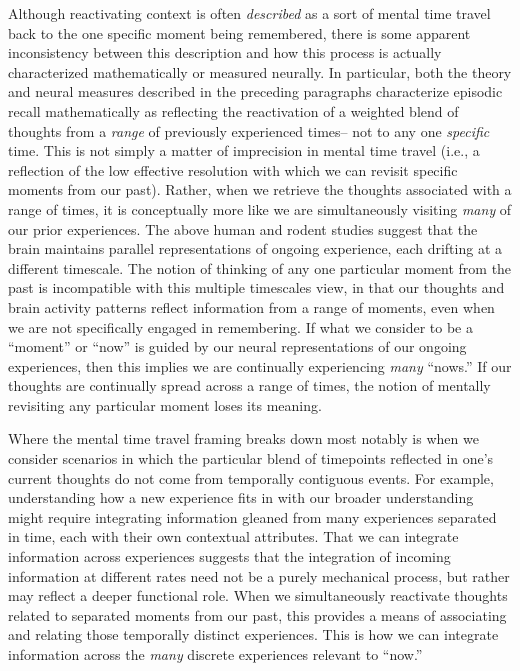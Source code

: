 \documentclass{article}
\begin{document}
Although reactivating context is often \textit{described} as a sort of mental time travel back to the one specific moment being remembered, there is some apparent inconsistency between this description and how this process is actually characterized mathematically or measured neurally.  In particular, both the theory and neural measures described in the preceding paragraphs characterize episodic recall mathematically as reflecting the reactivation of a weighted blend of thoughts from a \textit{range} of previously experienced times-- not to any one \textit{specific} time.  This is not simply a matter of imprecision in mental time travel (i.e., a reflection of the low effective resolution with which we can revisit specific moments from our past).  Rather, when we retrieve the thoughts associated with a range of times, it is conceptually more like we are simultaneously visiting \textit{many} of our prior experiences. The above human and rodent studies suggest that the brain maintains parallel representations of ongoing experience, each drifting at a different timescale.  The notion of thinking of any one particular moment from the past is incompatible with this multiple timescales view, in that our thoughts and brain activity patterns reflect information from a range of moments, even when we are not specifically engaged in remembering.  If what we consider to be a ``moment'' or ``now'' is guided by our neural representations of our ongoing experiences, then this implies we are continually experiencing \textit{many} ``nows.''  If our thoughts are continually spread across a range of times, the notion of mentally revisiting any particular moment loses its meaning.

Where the mental time travel framing breaks down most notably is when we consider scenarios in which the particular blend of timepoints reflected in one's current thoughts do not come from temporally contiguous events.  For example, understanding how a new experience fits in with our broader understanding might require integrating information gleaned from many experiences separated in time, each with their own contextual attributes.  That we can integrate information across experiences suggests that the integration of incoming information at different rates need not be a purely mechanical process, but rather may reflect a deeper functional role.  When we simultaneously reactivate thoughts related to separated moments from our past, this provides a means of associating and relating those temporally distinct experiences.  This is how we can integrate information across the \textit{many} discrete experiences relevant to ``now.''
\end{document}

